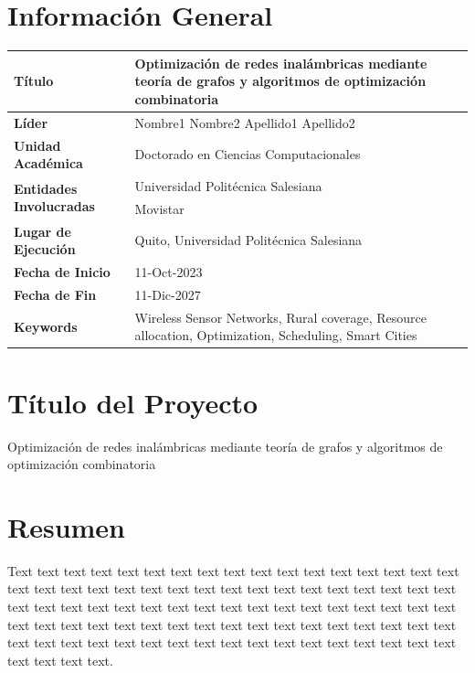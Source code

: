\documentclass[12pt,a4paper]{article}
\begin{document}

\section{Información General}\label{sec:GeneralInformation}
\begin{table}[ht!]
\centering
\begin{tabular}{p{4cm}|p{9cm}}
\hline
\textbf{Título} &  Optimización de redes inalámbricas mediante teoría de grafos y algoritmos de optimización combinatoria   \\
\hline
\textbf{Líder} & Nombre1 Nombre2 Apellido1 Apellido2 \\
\hline
\textbf{Unidad Académica} & Doctorado en Ciencias Computacionales \\
\hline
\multirow{2}{4cm}{\textbf{Entidades Involucradas}} & Universidad Politécnica Salesiana \\
& Movistar \\ \hline
\textbf{Lugar de Ejecución} & Quito, Universidad Politécnica Salesiana \\
\hline
\textbf{Fecha de Inicio} &   11-Oct-2023\\
\hline
\textbf{Fecha de Fin} &  11-Dic-2027 \\
\hline
\textbf{Keywords} & Wireless Sensor Networks, Rural coverage, Resource allocation, Optimization, Scheduling, Smart Cities \\
\hline
\end{tabular}
\end{table}
\section{Título del Proyecto}
Optimización de redes inalámbricas mediante teoría de grafos y algoritmos de optimización combinatoria
\section{Resumen}\label{sec:1}
Text text text text text text text text text text text text text text text text text text text text text text text text text text text text text text text text text text text text text text text text text text text text text text text text text text text text text text text text text text text text text text text text text text text text text text text text text text text text text text text text text text text text text text text text text.
\end{document}
